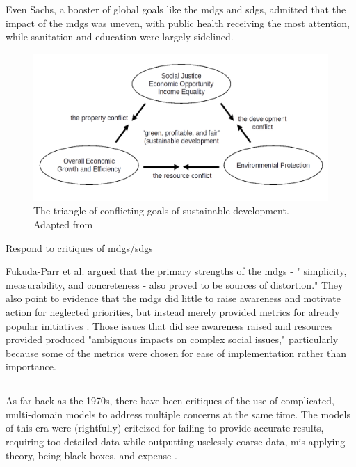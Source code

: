 Even Sachs, a booster of global goals like the \acp{mdg} and \acp{sdg}, admitted that the impact of the \acp{mdg} was uneven, with public health receiving the most attention, while sanitation and education were largely sidelined. \cite{sachsAgeSustainableDevelopment2015}

\begin{figure}[h]
	\centering
	\includegraphics[scale=0.35]{Figures/chap2/sustainable_triangle.png}
	\caption[The triangle of conflicting goals of sustainable development]{The triangle of conflicting goals of sustainable development. Adapted from \cite{campbellGreenCitiesGrowing2016}}
	\label{fig:sustainable_triangle}
\end{figure}

Respond to critiques of \acp{mdg}/\acp{sdg} \cite{alstonShipsPassingNight2005, reddyGlobalDevelopmentGoals2008}

Fukuda-Parr et al. argued that the primary strengths of the \acp{mdg} - " simplicity, measurability, and concreteness - also proved to be sources of distortion." They also point to evidence that the \acp{mdg} did little to raise awareness and motivate action for neglected priorities, but instead merely provided metrics for already popular initiatives \cite{fukuda-parrPowerNumbersCritical2014}. Those issues that did see awareness raised and resources provided produced "ambiguous impacts on complex social issues," particularly because some of the metrics were chosen for ease of implementation rather than importance.


\subsection{} \label{sec:scenario_critique}


As far back as the 1970s, there have been critiques of the use of complicated, multi-domain models to address multiple concerns at the same time. The models of this era were (rightfully) critcized for failing to provide accurate results, requiring too detailed data while outputting uselessly coarse data, mis-applying theory, being black boxes, and expense \cite{leejrRequiemLargeScaleModels1973}.

